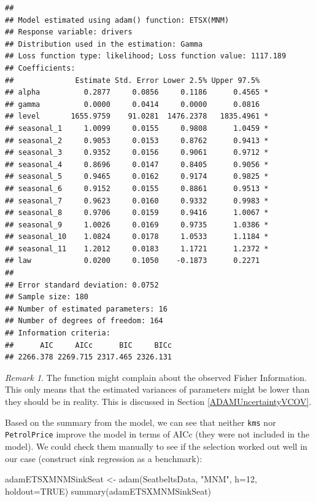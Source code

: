 \documentclass[
]{book}
\newenvironment{Shaded}{\begin{snugshade}}{\end{snugshade}}
\newcommand{\AttributeTok}[1]{\textcolor[rgb]{0.77,0.63,0.00}{#1}}
\newcommand{\ConstantTok}[1]{\textcolor[rgb]{0.00,0.00,0.00}{#1}}
\newcommand{\DecValTok}[1]{\textcolor[rgb]{0.00,0.00,0.81}{#1}}
\newcommand{\FunctionTok}[1]{\textcolor[rgb]{0.00,0.00,0.00}{#1}}
\newcommand{\NormalTok}[1]{#1}
\newcommand{\OtherTok}[1]{\textcolor[rgb]{0.56,0.35,0.01}{#1}}
\newcommand{\StringTok}[1]{\textcolor[rgb]{0.31,0.60,0.02}{#1}}
\theoremstyle{definition}
\theoremstyle{definition}
\theoremstyle{definition}
\theoremstyle{definition}
\theoremstyle{remark}
\newtheorem*{remark}{Remark}
\begin{document}
\begin{verbatim}
## 
## Model estimated using adam() function: ETSX(MNM)
## Response variable: drivers
## Distribution used in the estimation: Gamma
## Loss function type: likelihood; Loss function value: 1117.189
## Coefficients:
##              Estimate Std. Error Lower 2.5% Upper 97.5%  
## alpha          0.2877     0.0856     0.1186      0.4565 *
## gamma          0.0000     0.0414     0.0000      0.0816  
## level       1655.9759    91.0281  1476.2378   1835.4961 *
## seasonal_1     1.0099     0.0155     0.9808      1.0459 *
## seasonal_2     0.9053     0.0153     0.8762      0.9413 *
## seasonal_3     0.9352     0.0156     0.9061      0.9712 *
## seasonal_4     0.8696     0.0147     0.8405      0.9056 *
## seasonal_5     0.9465     0.0162     0.9174      0.9825 *
## seasonal_6     0.9152     0.0155     0.8861      0.9513 *
## seasonal_7     0.9623     0.0160     0.9332      0.9983 *
## seasonal_8     0.9706     0.0159     0.9416      1.0067 *
## seasonal_9     1.0026     0.0169     0.9735      1.0386 *
## seasonal_10    1.0824     0.0178     1.0533      1.1184 *
## seasonal_11    1.2012     0.0183     1.1721      1.2372 *
## law            0.0200     0.1050    -0.1873      0.2271  
## 
## Error standard deviation: 0.0752
## Sample size: 180
## Number of estimated parameters: 16
## Number of degrees of freedom: 164
## Information criteria:
##      AIC     AICc      BIC     BICc 
## 2266.378 2269.715 2317.465 2326.131
\end{verbatim}

\begin{remark}
The function might complain about the observed Fisher Information. This only means that the estimated variances of parameters might be lower than they should be in reality. This is discussed in Section \ref{ADAMUncertaintyVCOV}.
\end{remark}

Based on the summary from the model, we can see that neither \texttt{kms} nor \texttt{PetrolPrice} improve the model in terms of AICc (they were not included in the model). We could check them manually to see if the selection worked out well in our case (construct sink regression as a benchmark):

\begin{Shaded}
\begin{Highlighting}[]
\NormalTok{adamETSXMNMSinkSeat }\OtherTok{\textless{}{-}} \FunctionTok{adam}\NormalTok{(SeatbeltsData, }\StringTok{"MNM"}\NormalTok{,}
                             \AttributeTok{h=}\DecValTok{12}\NormalTok{, }\AttributeTok{holdout=}\ConstantTok{TRUE}\NormalTok{)}
\FunctionTok{summary}\NormalTok{(adamETSXMNMSinkSeat)}
\end{Highlighting}
\end{Shaded}
\end{document}
